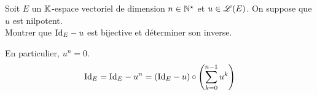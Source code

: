 \begin{exercice}
    Soit $E$ un $\mathbb{K}$-espace vectoriel de dimension $n \in \mathbb{N}^\star$ et $u \in \mathscr{L}(E)$. On suppose que $u$ est nilpotent. \\
    Montrer que $\mathrm{Id}_E - u$ est bijective et déterminer son inverse.
\end{exercice}

En particulier, $\boxed{u^n = 0}$.
$$\mathrm{Id}_E = \mathrm{Id}_E - u^n = (\mathrm{Id}_E - u) \circ \left( \sum_{k = 0}^{n-1} u^k \right)$$